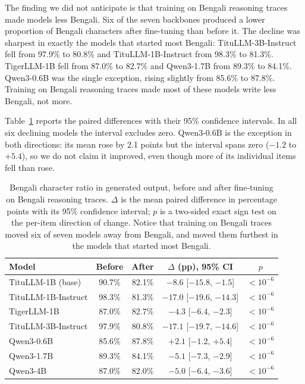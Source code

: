 \documentclass[10pt,twocolumn,letterpaper]{article}
\begin{document}
The finding we did not anticipate is that training on Bengali reasoning traces
made models less Bengali. Six of the seven backbones produced a lower
proportion of Bengali characters after fine-tuning than before it. The
decline was sharpest in exactly the models that started most Bengali:
TituLLM-3B-Instruct fell from 97.9\% to 80.8\% and TituLLM-1B-Instruct from
98.3\% to 81.3\%. TigerLLM-1B fell from 87.0\% to 82.7\% and Qwen3-1.7B from
89.3\% to 84.1\%. Qwen3-0.6B was the single exception, rising slightly from
85.6\% to 87.8\%. Training on Bengali reasoning traces made most of these
models write less Bengali, not more.

Table~\ref{tab:adherence} reports the paired differences with their
95\% confidence intervals. In all six declining models the interval
excludes zero. Qwen3-0.6B is the exception in both directions: its mean
rose by 2.1 points but the interval spans zero ($-1.2$ to $+5.4$), so we
do not claim it improved, even though more of its individual items fell
than rose.

\begin{table}[t]
\caption{Bengali character ratio in generated output, before and after
fine-tuning on Bengali reasoning traces. $\Delta$ is the mean paired
difference in percentage points with its 95\% confidence interval; $p$ is
a two-sided exact sign test on the per-item direction of change. Notice
that training on Bengali traces moved six of seven models away from
Bengali, and moved them furthest in the models that started most Bengali.}
\label{tab:adherence}
\centering\small
\begin{tabular}{|l|c|c|c|c|}
\hline
\textbf{Model} & \textbf{Before} & \textbf{After} & \textbf{$\Delta$ (pp), 95\% CI} & \textbf{$p$} \\
\hline
TituLLM-1B (base) & 90.7\% & 82.1\% & $-8.6$ [$-15.8$, $-1.5$] & $<10^{-6}$ \\
TituLLM-1B-Instruct & 98.3\% & 81.3\% & $-17.0$ [$-19.6$, $-14.3$] & $<10^{-6}$ \\
TigerLLM-1B & 87.0\% & 82.7\% & $-4.3$ [$-6.4$, $-2.3$] & $<10^{-6}$ \\
TituLLM-3B-Instruct & 97.9\% & 80.8\% & $-17.1$ [$-19.7$, $-14.6$] & $<10^{-6}$ \\
Qwen3-0.6B & 85.6\% & 87.8\% & $+2.1$ [$-1.2$, $+5.4$] & $<10^{-6}$ \\
Qwen3-1.7B & 89.3\% & 84.1\% & $-5.1$ [$-7.3$, $-2.9$] & $<10^{-6}$ \\
Qwen3-4B & 87.0\% & 82.0\% & $-5.0$ [$-6.4$, $-3.6$] & $<10^{-6}$ \\
\hline
\end{tabular}
\end{table}
\end{document}
